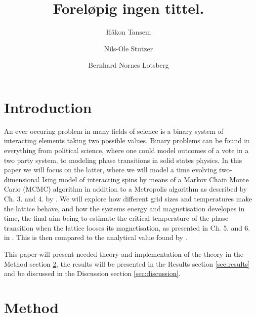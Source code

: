 \documentclass[twocolumn]{aastex62}
\begin{document}
\title{\Large Foreløpig ingen tittel.}

\author{Håkon Tansem}

\author{Nils-Ole Stutzer}

\author{Bernhard Nornes Lotsberg}

\begin{abstract}

\end{abstract}

\section{Introduction} \label{sec:intro}
An ever occuring problem in many fields of science is a binary system of
interacting elements taking two possible values. Binary problems can be found in
everything from political science, where one could model outcomes of a vote in a
two party system, to modeling phase transitions in solid states physics. In this
paper we will focus on the latter, where we will model a time evolving
two-dimensional Ising model of interacting spins by means of a Markov Chain
Monte Carlo (MCMC) algorithm in addition to a Metropolis algorithm as described
by Ch. 3. and 4. by \cite{newman:2019}. We will explore how
different grid sizes and temperatures make the lattice behave, and how the systems energy and magnetisation
developes in time, the final aim being to estimate the critical temperature of
the phase transition when the lattice looses its magnetisation, as presented in
Ch. 5. and 6. in \cite{plischke:2006}. This is then
compared to the analytical value found by \cite{onsager:1944}.

This paper will present needed theory and implementation of the theory in the Method
section \ref{sec:method}, the results will be presented in the Results section
\ref{sec:results} and be discussed in the Discussion section
\ref{sec:discussion}.

\section{Method} \label{sec:method}
\end{document}
